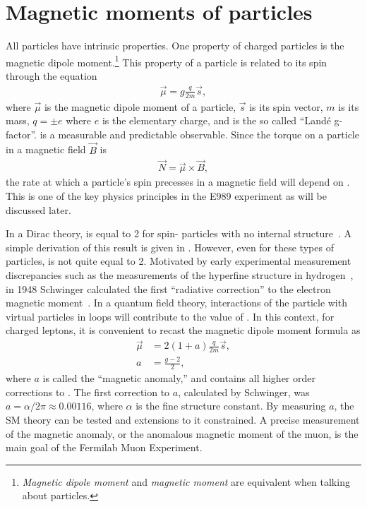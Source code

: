 \section{Magnetic moments of particles}
\label{sec:MDMs}

All particles have intrinsic properties. One property of charged particles is the magnetic dipole moment.\footnote{\textit{Magnetic dipole moment} and \textit{magnetic moment} are equivalent when talking about particles.} This property of a particle is related to its spin through the equation
		\begin{align}
            \vec{\mu} = g \frac{q}{2m} \vec{s},
        \label{eq:magneticmoment}
		\end{align}
where $\vec{\mu}$ is the magnetic dipole moment of a particle, $\vec{s}$ is its spin vector, $m$ is its mass, $q = \pm e$ where $e$ is the elementary charge, and \g is the so called ``Land\'{e} g-factor''. \g is a measurable and predictable observable. Since the torque on a particle in a magnetic field $\vec{B}$ is 
		\begin{align}
            \vec{N} = \vec{\mu} \times \vec{B},
        \label{eq:torque}
		\end{align}
the rate at which a particle's spin precesses in a magnetic field will depend on \g. This is one of the key physics principles in the E989 experiment as will be discussed later.

In a Dirac theory, \g is equal to 2 for spin-\textonehalf\xspace particles with no internal structure~\cite{Dirac}. A simple derivation of this result is given in . However, even for these types of particles, \g is not quite equal to 2. Motivated by early experimental measurement discrepancies such as the measurements of the hyperfine structure in hydrogen~\cite{EarlyHyperfine1}, in 1948 Schwinger calculated the first ``radiative correction'' to the electron magnetic moment~\cite{Schwinger}. In a quantum field theory, interactions of the particle with virtual particles in loops will contribute to the value of \g. In this context, for charged leptons, it is convenient to recast the magnetic dipole moment formula as 
		\begin{equation}
		\begin{aligned}
            \vec{\mu} &= 2(1+a) \frac{q}{2m} \vec{s}, \\
            a &= \frac{g-2}{2},
        \label{eq:anamoly}
		\end{aligned}
		\end{equation}
where $a$ is called the ``magnetic anomaly,'' and contains all higher order corrections to \g. The first correction to $a$, calculated by Schwinger, was $a = \alpha/2\pi \approx 0.00116$, where $\alpha$ is the fine structure constant. By measuring $a$, the SM theory can be tested and extensions to it constrained. A precise measurement of the magnetic anomaly, or the anomalous magnetic moment of the muon, is the main goal of the Fermilab Muon \gmtwo Experiment.


